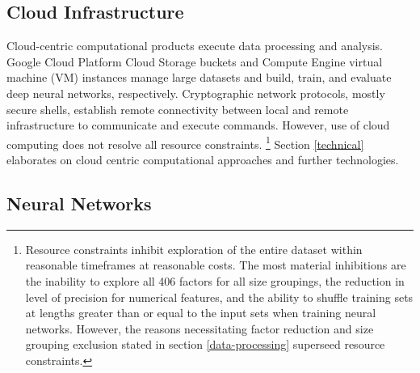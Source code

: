 \documentclass[12pt]{article}
\begin{document}
\subsection{Cloud Infrastructure}
Cloud-centric computational products execute data processing and analysis.
Google Cloud Platform Cloud Storage buckets and Compute Engine virtual machine (VM) instances manage large datasets and build, train, and evaluate deep neural networks, respectively.
Cryptographic network protocols, mostly secure shells, establish remote connectivity between local and remote infrastructure to communicate and execute commands.
However, use of cloud computing does not resolve all resource constraints. 
\footnote{Resource constraints inhibit exploration of the entire dataset within reasonable timeframes at reasonable costs.
The most material inhibitions are the inability to explore all 406 factors for all size groupings, the reduction in level of precision for numerical features, and
the ability to shuffle training sets at lengths greater than or equal to the input sets when training neural networks.
However, the reasons necessitating factor reduction and size grouping exclusion stated in section \ref{data-processing} superseed resource constraints.}
Section \ref{technical} elaborates on cloud centric computational approaches and further technologies.

\subsection{Neural Networks}
\end{document}
